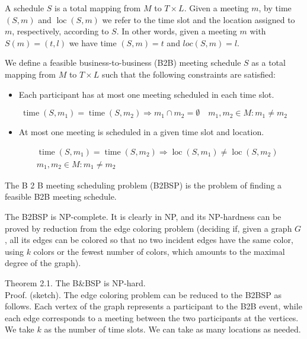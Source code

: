 \documentclass[10pt]{article}
\begin{document}
A schedule $S$ is a total mapping from $M$ to $T \times L$. Given a meeting $m$, by time $(S, m)$ and $\operatorname{loc}(S, m)$ we refer to the time slot and the location assigned to $m$, respectively, according to $S$. In other words, given a meeting $m$ with $S(m)=(t, l)$ we have time $(S, m)=t$ and $l o c(S, m)=l$.

We define a feasible business-to-business (B2B) meeting schedule $S$ as a total mapping from $M$ to $T \times L$ such that the following constraints are satisfied:

\begin{itemize}
  \item Each participant has at most one meeting scheduled in each time slot.
\end{itemize}


\begin{equation*}
\operatorname{time}\left(S, m_{1}\right)=\operatorname{time}\left(S, m_{2}\right) \Longrightarrow m_{1} \cap m_{2}=\emptyset \quad m_{1}, m_{2} \in M: m_{1} \neq m_{2} \tag{1}
\end{equation*}


\begin{itemize}
  \item At most one meeting is scheduled in a given time slot and location.
\end{itemize}


\begin{align*}
& \operatorname{time}\left(S, m_{1}\right)=\operatorname{time}\left(S, m_{2}\right) \Longrightarrow \operatorname{loc}\left(S, m_{1}\right) \neq \operatorname{loc}\left(S, m_{2}\right) \\
& m_{1}, m_{2} \in M: m_{1} \neq m_{2} \tag{2}
\end{align*}


The B 2 B meeting scheduling problem (B2BSP) is the problem of finding a feasible B2B meeting schedule.

The B2BSP is NP-complete. It is clearly in NP, and its NP-hardness can be proved by reduction from the edge coloring problem (deciding if, given a graph $G$, all its edges can be colored so that no two incident edges have the same color, using $k$ colors or the fewest number of colors, which amounts to the maximal degree of the graph).

Theorem 2.1. The B\&BSP is NP-hard.\\
Proof. (sketch). The edge coloring problem can be reduced to the B2BSP as follows. Each vertex of the graph represents a participant to the B2B event, while each edge corresponds to a meeting between the two participants at the vertices. We take $k$ as the number of time slots. We can take as many locations as needed.
\end{document}
